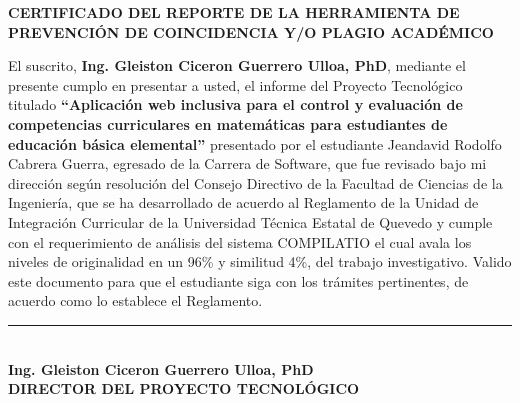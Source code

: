 \begin{center}
    \vspace*{0.5cm}
    \begin{minipage}{0.95\textwidth}
        \centering
        \textbf{CERTIFICADO DEL REPORTE DE LA HERRAMIENTA DE PREVENCIÓN DE COINCIDENCIA Y/O PLAGIO ACADÉMICO}
    \end{minipage}
\end{center}
\vspace{1cm}

\justifying
El suscrito, \textbf{Ing. Gleiston Ciceron Guerrero Ulloa, PhD}, mediante el presente cumplo en presentar a usted, el informe del Proyecto Tecnológico titulado \textbf{``Aplicación web inclusiva para el control y evaluación de competencias curriculares en matemáticas para estudiantes de educación básica elemental''} presentado por el estudiante Jeandavid Rodolfo Cabrera Guerra, egresado de la Carrera de Software, que fue revisado bajo mi dirección según resolución del Consejo Directivo de la Facultad de Ciencias de la Ingeniería, que se ha desarrollado de acuerdo al Reglamento de la Unidad de Integración Curricular de la Universidad Técnica Estatal de Quevedo y cumple con el requerimiento de análisis del sistema COMPILATIO el cual avala los niveles de originalidad en un 96\% y similitud 4\%, del trabajo investigativo. Valido este documento para que el estudiante siga con los trámites pertinentes, de acuerdo como lo establece el Reglamento.

\vspace{3cm}

\begin{center}
    \rule{8cm}{0.4pt}\\[0.2cm]
    \textbf{Ing. Gleiston Ciceron Guerrero Ulloa, PhD}\\
    \textbf{DIRECTOR DEL PROYECTO TECNOLÓGICO}
\end{center}

\newpage
